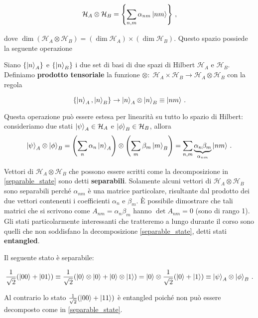 \begin{equation*}
    \mathcal{H}_A \otimes \mathcal{H}_B = \left\lbrace \sum_{n,m} \alpha_{nm} \ket{nm} \right\rbrace \, ,
\end{equation*}

\noindent dove $\dim (\mathcal{H}_A \otimes \mathcal{H}_B) = (\dim \mathcal{H}_A) \times (\dim \mathcal{H}_B)$. Questo spazio possiede la seguente operazione

\begin{definizione}
    Siano $\lbrace \ket{n}_A \rbrace$ e $\lbrace \ket{n}_B \rbrace$ i due set di basi di due spazi di Hilbert $\mathcal{H}_A$ e $\mathcal{H}_B$. Definiamo \textbf{prodotto tensoriale} la funzione $\otimes: \; \mathcal{H}_A \times \mathcal{H}_B \rightarrow \mathcal{H}_A \otimes \mathcal{H}_B$ con la regola
    
    \begin{equation*}
        \lbrace \ket{n}_A, \ket{n}_B \rbrace \rightarrow \ket{n}_A \otimes \ket{n}_B \equiv \ket{nm} \, .     
    \end{equation*}
\end{definizione}

\noindent Questa operazione può essere estesa per linearità su tutto lo spazio di Hilbert: consideriamo due stati $\ket{\psi}_A \in \mathcal{H}_A$ e $\ket{\phi}_B \in \mathcal{H}_B$, allora
\begin{equation}\label{separable_state}
    \ket{\psi}_A \otimes \ket{\phi}_B = \left( \sum_n \alpha_n \ket{n}_A \right) \otimes \left( \sum_m \beta_m \ket{m}_B \right) = \sum_{n,m} \underbrace{\alpha_n \beta_m}_{\alpha_{nm}} \ket{nm} \, .
\end{equation}

\noindent Vettori di $\mathcal{H}_A \otimes \mathcal{H}_B$ che possono essere scritti come la decomposizione in \eqref{separable_state} sono detti \textbf{separabili}. Solamente alcuni vettori di $\mathcal{H}_A \otimes \mathcal{H}_B$ sono separabili perché $\alpha_{nm}$ è una matrice particolare, risultante dal prodotto dei due vettori contenenti i coefficienti $\alpha_n$ e $\beta_m$. È possibile dimostrare che tali matrici che si scrivono come $A_{nm} = \alpha_n \beta_m$ hanno $\det A_{nm} = 0$ (sono di rango 1). Gli stati particolarmente interessanti che tratteremo a lungo durante il corso sono quelli che non soddisfano la decomposizione \eqref{separable_state}, detti stati \textbf{entangled}. 

\begin{esempio}
    Il seguente stato è separabile:
    
    \begin{equation*}
        \frac{1}{\sqrt{2}} (\ket{00} + \ket{01}) \equiv \frac{1}{\sqrt{2}} (\ket{0} \otimes \ket{0} + \ket{0} \otimes \ket{1}) = \ket{0} \otimes \frac{1}{\sqrt{2}} (\ket{0} + \ket{1}) \equiv \ket{\psi}_A \otimes \ket{\phi}_B \, .
    \end{equation*}
    
    \noindent Al contrario lo stato $\frac{1}{\sqrt{2}} (\ket{00} + \ket{11})$ è entangled poiché non può essere decomposto come in \eqref{separable_state}. 
\end{esempio}

